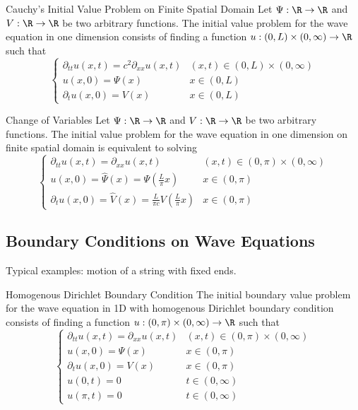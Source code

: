 \documentclass[a4paper]{article}
\begin{document}
\begin{defn}{Cauchy's Initial Value Problem on Finite Spatial Domain}{} Let $\Psi:\R\to\R$ and $V:\R\to\R$ be two arbitrary functions. The initial value problem for the wave equation in one dimension consists of finding a function $u:(0,L)\times(0,\infty)\to\R$ such that
$$\begin{cases}
\partial_{tt}u(x,t)=c^2\partial_{xx}u(x,t) & (x,t)\in(0,L)\times(0,\infty)\\
u(x,0)=\Psi(x) & x\in(0,L)\\
\partial_tu(x,0)=V(x) & x\in(0,L)
\end{cases}$$
\end{defn}

\begin{prp}{Change of Variables}{} Let $\Psi:\R\to\R$ and $V:\R\to\R$ be two arbitrary functions. The initial value problem for the wave equation in one dimension on finite spatial domain is equivalent to solving $$\begin{cases}
\partial_{tt}u(x,t)=\partial_{xx}u(x,t) & (x,t)\in(0,\pi)\times(0,\infty)\\
u(x,0)=\hat{\Psi}(x)=\Psi\left(\frac{L}{\pi}x\right) & x\in(0,\pi)\\
\partial_tu(x,0)=\hat{V}(x)=\frac{L}{\pi c}V\left(\frac{L}{\pi}x\right) & x\in(0,\pi)
\end{cases}$$ 
\end{prp}

\subsection{Boundary Conditions on Wave Equations}
Typical examples: motion of a string with fixed ends. 
\begin{defn}{Homogenous Dirichlet Boundary Condition}{} The initial boundary value problem for the wave equation in 1D with homogenous Dirichlet boundary condition consists of finding a function $u:(0,\pi)\times(0,\infty)\to\R$ such that 
$$\begin{cases}
\partial_{tt}u(x,t)=\partial_{xx}u(x,t) & (x,t)\in(0,\pi)\times(0,\infty)\\
u(x,0)=\Psi(x) & x\in(0,\pi)\\
\partial_tu(x,0)=V(x) & x\in(0,\pi)\\
u(0,t)=0 & t\in(0,\infty)\\
u(\pi,t)=0 & t\in(0,\infty)
\end{cases}$$
\end{defn}
\end{document}
